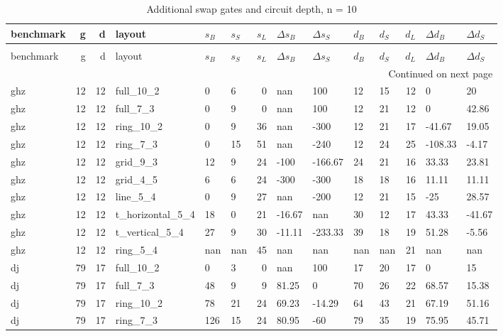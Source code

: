 \begin{longtable}{lrrlllrllllrll}
\caption{Additional swap gates and circuit depth, n = 10} \label{benchmark-table-10} \\
\toprule
benchmark & g & d & layout & $s_B$ & $s_S$ & $s_L$ & $\Delta s_B$ & $\Delta s_S$ & $d_B$ & $d_S$ & $d_L$ & $\Delta d_B$ & $\Delta d_S$ \\
\midrule
\endfirsthead
\caption[]{Additional swap gates and circuit depth, n = 10} \\
\toprule
benchmark & g & d & layout & $s_B$ & $s_S$ & $s_L$ & $\Delta s_B$ & $\Delta s_S$ & $d_B$ & $d_S$ & $d_L$ & $\Delta d_B$ & $\Delta d_S$ \\
\midrule
\endhead
\midrule
\multicolumn{14}{r}{Continued on next page} \\
\midrule
\endfoot
\bottomrule
\endlastfoot
ghz & 12 & 12 & full\_10\_2 & 0 & 6 & 0 & nan & 100 & 12 & 15 & 12 & 0 & 20 \\
ghz & 12 & 12 & full\_7\_3 & 0 & 9 & 0 & nan & 100 & 12 & 21 & 12 & 0 & 42.86 \\
ghz & 12 & 12 & ring\_10\_2 & 0 & 9 & 36 & nan & -300 & 12 & 21 & 17 & -41.67 & 19.05 \\
ghz & 12 & 12 & ring\_7\_3 & 0 & 15 & 51 & nan & -240 & 12 & 24 & 25 & -108.33 & -4.17 \\
ghz & 12 & 12 & grid\_9\_3 & 12 & 9 & 24 & -100 & -166.67 & 24 & 21 & 16 & 33.33 & 23.81 \\
ghz & 12 & 12 & grid\_4\_5 & 6 & 6 & 24 & -300 & -300 & 18 & 18 & 16 & 11.11 & 11.11 \\
ghz & 12 & 12 & line\_5\_4 & 0 & 9 & 27 & nan & -200 & 12 & 21 & 15 & -25 & 28.57 \\
ghz & 12 & 12 & t\_horizontal\_5\_4 & 18 & 0 & 21 & -16.67 & nan & 30 & 12 & 17 & 43.33 & -41.67 \\
ghz & 12 & 12 & t\_vertical\_5\_4 & 27 & 9 & 30 & -11.11 & -233.33 & 39 & 18 & 19 & 51.28 & -5.56 \\
ghz & 12 & 12 & ring\_5\_4 & nan & nan & 45 & nan & nan & nan & nan & 21 & nan & nan \\
dj & 79 & 17 & full\_10\_2 & 0 & 3 & 0 & nan & 100 & 17 & 20 & 17 & 0 & 15 \\
dj & 79 & 17 & full\_7\_3 & 48 & 9 & 9 & 81.25 & 0 & 70 & 26 & 22 & 68.57 & 15.38 \\
dj & 79 & 17 & ring\_10\_2 & 78 & 21 & 24 & 69.23 & -14.29 & 64 & 43 & 21 & 67.19 & 51.16 \\
dj & 79 & 17 & ring\_7\_3 & 126 & 15 & 24 & 80.95 & -60 & 79 & 35 & 19 & 75.95 & 45.71 \\

\end{longtable}
